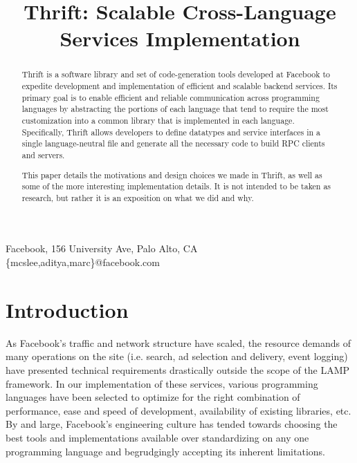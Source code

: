 \documentclass[nocopyrightspace,blockstyle]{sigplanconf}
\begin{document}


\title{Thrift: Scalable Cross-Language Services Implementation}
\subtitle{}

           {Facebook, 156 University Ave, Palo Alto, CA}
           {\{mcslee,aditya,marc\}@facebook.com}

\maketitle

\begin{abstract}
Thrift is a software library and set of code-generation tools developed at
Facebook to expedite development and implementation of efficient and scalable
backend services. Its primary goal is to enable efficient and reliable
communication across programming languages by abstracting the portions of each
language that tend to require the most customization into a common library
that is implemented in each language. Specifically, Thrift allows developers to
define datatypes and service interfaces in a single language-neutral file
and generate all the necessary code to build RPC clients and servers.

This paper details the motivations and design choices we made in Thrift, as
well as some of the more interesting implementation details. It is not
intended to be taken as research, but rather it is an exposition on what we did
and why.
\end{abstract}




\section{Introduction}
As Facebook's traffic and network structure have scaled, the resource
demands of many operations on the site (i.e. search, 
ad selection and delivery, event logging) have presented technical requirements
drastically outside the scope of the LAMP framework. In our implementation of
these services, various programming languages have been selected to
optimize for the right combination of performance, ease and speed of
development, availability of existing libraries, etc. By and large,
Facebook's engineering culture has tended towards choosing the best
tools and implementations available over standardizing on any one
programming language and begrudgingly accepting its inherent limitations.
\end{document}
